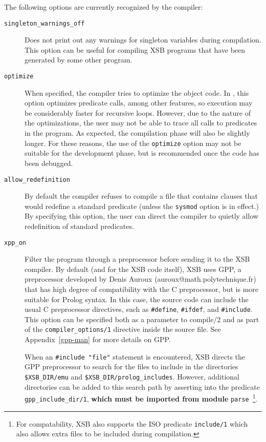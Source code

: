 The following options are currently recognized by the compiler:
\begin{description}
\item[{\tt singleton\_warnings\_off}] Does not print out any warnings
  for singleton variables during compilation.  This option can be
  useful for compiling XSB programs that have been generated by some
  other program.
%
\item[{\tt optimize}] When specified, the
  compiler tries to optimize the object code.  In \version, this
  option optimizes predicate calls, among other features, so execution
  may be considerably faster for recursive loops.  However, due to the
  nature of the optimizations, the user may not be able to trace all
  calls to predicates in the program.  As expected, the compilation
  phase will also be slightly longer.  For these reasons, the use of
  the {\tt optimize} option may not be suitable for the development
  phase, but is recommended once the code has been debugged.
%
\item[{\tt allow\_redefinition}] 
	By default the compiler refuses to compile a file that
	contains clauses that would redefine a standard predicate
	(unless the {\tt sysmod} option is in effect.)  By specifying
	this option, the user can direct the compiler to quietly allow
	redefinition of standard predicates.
%
\item[{\tt xpp\_on}]
  Filter the program through a preprocessor  before sending it to the XSB 
  compiler. By default (and for the XSB code itself), XSB uses GPP, a
  preprocessor developed by Denis Auroux (auroux@math.polytechnique.fr)
  that has high degree of compatibility with the C preprocessor, but is
  more suitable for Prolog syntax. In this case, the source code can
  include the usual C 
  preprocessor directives, such as \verb|#define|, \verb|#ifdef|, and
  \verb|#include|. This option can be specified both as a parameter to
  compile/2 and as part of the {\tt compiler\_options/1} directive inside
  the source file. See Appendix~\ref{gpp-man} for more details on GPP.

  When an \verb|#include "file"| statement is encountered, XSB directs
  the GPP preprocessor to search for the files to include in the
  directories \verb|$XSB_DIR/emu| and
  \verb|$XSB_DIR/prolog_includes|. 
  However, additional directories can be added to this search path by
  asserting into the predicate \verb|gpp_include_dir/1|, {\bf which
    must be imported from module} {\tt parse}~\footnote{For
    compatability, XSB also supports the ISO predicate {\tt include/1}
    which also allows extra files to be included during compilation.}.
  

\end{description}
